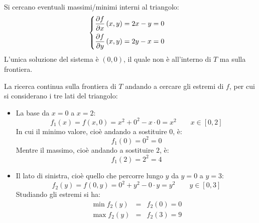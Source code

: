 \documentclass[a4paper]{article}
\begin{document}
	\noindent
	Si cercano eventuali massimi/minimi interni al triangolo:
	\begin{equation*}
		\begin{cases}
			\dfrac{\partial f}{\partial x} \left(x,y\right) = 2x-y = 0 \vspace{.5em}\\
			\dfrac{\partial f}{\partial y} \left(x,y\right) = 2y-x = 0 
		\end{cases}
	\end{equation*}
	L'unica soluzione del sistema è $\left(0,0\right)$, il quale non è all'interno di $T$ ma sulla frontiera.\newline

	\noindent
	La ricerca continua sulla frontiera di $T$ andando a cercare gli estremi di $f$, per cui si considerano i tre lati del triangolo:
	\begin{itemize}
		\item La base da $x = 0$ a $x = 2$:
		\begin{equation*}
			f_{1}\left(x\right) = f\left(x,0\right) = x^{2} + 0^{2} - x \cdot 0 = x^{2} \hspace{2em} x \in \left[0,2\right]
		\end{equation*}
		In cui il minimo valore, cioè andando a sostituire $0$, è:
		\begin{equation*}
			f_{1}\left(0\right) = 0^{2} = 0
		\end{equation*}
		Mentre il massimo, cioè andando a sostituire $2$, è:
		\begin{equation*}
			f_{1}\left(2\right) = 2^{2} = 4
		\end{equation*}

		\item Il lato di sinistra, cioè quello che percorre lungo $y$ da $y = 0$ a $y = 3$:
		\begin{equation*}
			f_{2}\left(y\right) = f\left(0,y\right) = 0^{2} + y^{2} - 0 \cdot y = y^{2} \hspace{2em} y \in \left[0,3\right]
		\end{equation*}
		Studiando gli estremi si ha:
		\begin{equation*}
			\begin{array}{rcl}
				\min f_{2}\left(y\right) &=& f_{2}\left(0\right) = 0 \\ [.5em]
				\max f_{2}\left(y\right) &=& f_{2}\left(3\right) = 9
			\end{array}
		\end{equation*}


\end{itemize}
\end{document}

